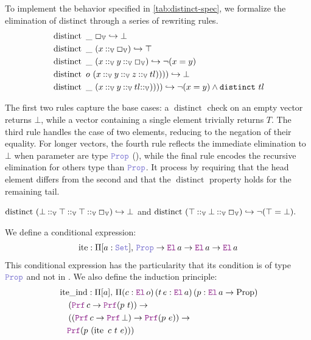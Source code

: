 \begin{definition}
To implement the behavior specified in \cref{tab:distinct-spec}, we formalize the elimination of distinct through a series of rewriting rules.
\begin{align*}
&\mathop{\mathrm{distinct}}~ \mathbin{\_}~\Box_\mathbb{V} \hookrightarrow \bot \\
&\mathop{\mathrm{distinct}}~\mathbin{\_}~ (x \mathbin{::}_\mathbb{V} \Box_\mathbb{V}) \hookrightarrow \top \\
&\mathop{\mathrm{distinct}}~\mathbin{\_}~ (x \mathbin{::}_\mathbb{V} y \mathbin{::}_\mathbb{V}  \Box_\mathbb{V}) \hookrightarrow \neg (x = y) \\
&\mathop{\mathrm{distinct}}~o~(x \mathbin{::}_\mathbb{V} y \mathbin{::}_\mathbb{V} z \mathbin{::}_\mathbb{V} tl)))) \hookrightarrow \bot \\
&\mathop{\mathrm{distinct}}~\_~(x \mathbin{::}_\mathbb{V} y \mathbin{::}_\mathbb{V} tl \mathbin{::}_\mathbb{V})))) \hookrightarrow \neg (x = y) \land \texttt{\upshape{distinct}}~tl
\end{align*}

The first two rules capture the base cases: a \(\mathop{\mathrm{distinct}}\) check on an empty vector returns $\bot$, while a vector containing a single element trivially returns $T$.
The third rule handles the case of two elements, reducing to the negation of their equality.
For longer vectors, the fourth rule reflects the immediate elimination to  $\bot$ when parameter are type $\prop$ (),
while the final rule encodes the recursive elimination for others type than $\prop$. It process by requiring that the head element differs from the second and that the
\(\mathop{\mathrm{distinct}}\) property holds for the remaining tail.
\end{definition}

\begin{example}
\(
    \mathop{\mathrm{distinct}}~(\bot \mathbin{::}_\mathbb{V} \top \mathbin{::}_\mathbb{V} \top \mathbin{::}_\mathbb{V} \Box_\mathbb{V}) \hookrightarrow \bot
\)
and
\(
    \mathop{\mathrm{distinct}}~(\top \mathbin{::}_\mathbb{V} \bot \mathbin{::}_\mathbb{V} \Box_\mathbb{V}) \hookrightarrow \neg (\top = \bot).
\)
\end{example}

\begin{definition}
We define a conditional expression:
\begin{align*}
\mathop{\mathrm{ite}} : \Pi [a: \set],\, \prop \ra \el\,a \ra \el\,a \ra \el\,a
\end{align*}
This conditional expression has the particularity that its condition is of type $\prop$ and not in \B.
We also define the induction principle:
\begin{align*}
&\mathop{\mathrm{ite\_ind}} : \Pi [a],\, \Pi (c : \el\,o)\, (t\, e : \el\,a)\, (p : \el\,a \ra \mathrm{Prop})\\
&\quad\left( \prf\,c \ra \prf(p~t) \right) \ra \\
&\quad\left( (\prf\,c \ra \prf\,\bot) \ra \prf(p~e) \right) \ra \\
&\quad\prf(p~(\mathop{\mathrm{ite}}~c~t~e)))
\end{align*}
\end{definition}

